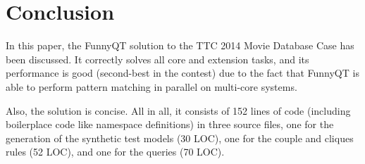 \documentclass[submission]{eptcs}
\begin{document}
\section{Conclusion}
\label{sec:conclusion}

In this paper, the FunnyQT solution to the TTC 2014 Movie Database Case has
been discussed.  It correctly solves all core and extension tasks, and its
performance is good (second-best in the contest) due to the fact that FunnyQT
is able to perform pattern matching in parallel on multi-core systems.

Also, the solution is concise.  All in all, it consists of 152 lines of code
(including boilerplace code like namespace definitions) in three source files,
one for the generation of the synthetic test models (30 LOC), one for the
couple and cliques rules (52 LOC), and one for the queries (70 LOC).




\end{document}
